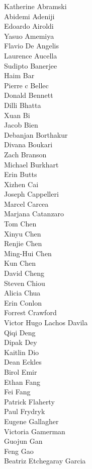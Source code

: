 Katherine Abramski\\
Abidemi Adeniji\\
Edoardo Airoldi\\
Yasuo Amemiya\\
Flavio De Angelis\\
Laurence Aucella\\
Sudipto Banerjee\\
Haim Bar\\
Pierre c Bellec\\
Donald Bennett\\
Dilli Bhatta\\
Xuan Bi\\
Jacob Bien\\
Debanjan Borthakur\\
Divana Boukari\\
Zach Branson\\
Michael Burkhart\\
Erin Butts\\
Xizhen Cai\\
Joseph Cappelleri\\
Marcel Carcea\\
Marjana Catanzaro\\
Tom Chen\\
Xinyu Chen\\
Renjie Chen\\
Ming-Hui  Chen\\
Kun Chen\\
David Cheng\\
Steven Chiou\\
Alicia Chua\\
Erin Conlon\\
Forrest Crawford\\
Victor Hugo Lachos Davila\\
Qiqi  Deng\\
Dipak Dey\\
Kaitlin Dio\\
Dean Eckles\\
Birol Emir\\
Ethan Fang\\
Fei Fang\\
Patrick Flaherty\\
Paul Frydryk\\
Eugene Gallagher\\
Victoria Gamerman\\
Guojun  Gan\\
Feng Gao\\
Beatriz Etchegaray Garcia\\
